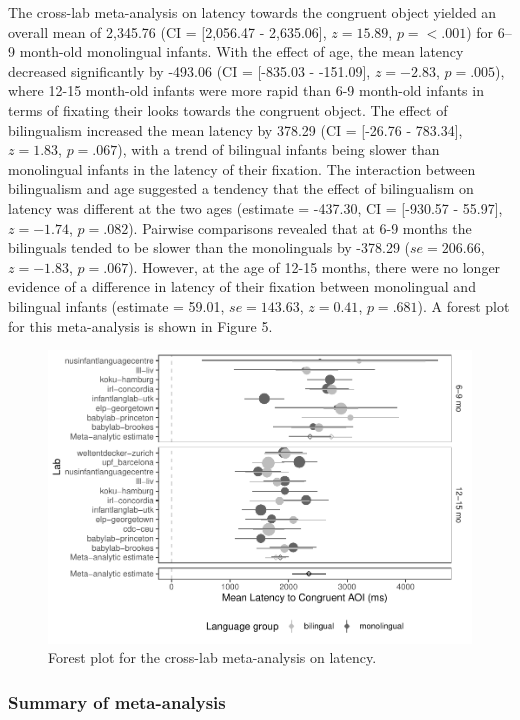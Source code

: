 \documentclass[,man,floatsintext]{apa6}
\begin{document}
The cross-lab meta-analysis on latency towards the congruent object yielded an overall mean of 2,345.76 (CI = {[}2,056.47 - 2,635.06{]}, \(z = 15.89\), \(p = < .001\)) for 6--9 month-old monolingual infants. With the effect of age, the mean latency decreased significantly by -493.06 (CI = {[}-835.03 - -151.09{]}, \(z = -2.83\), \(p = .005\)), where 12-15 month-old infants were more rapid than 6-9 month-old infants in terms of fixating their looks towards the congruent object. The effect of bilingualism increased the mean latency by 378.29 (CI = {[}-26.76 - 783.34{]}, \(z = 1.83\), \(p = .067\)), with a trend of bilingual infants being slower than monolingual infants in the latency of their fixation. The interaction between bilingualism and age suggested a tendency that the effect of bilingualism on latency was different at the two ages (estimate = -437.30, CI = {[}-930.57 - 55.97{]}, \(z = -1.74\), \(p = .082\)). Pairwise comparisons revealed that at 6-9 months the bilinguals tended to be slower than the monolinguals by -378.29 (\(se = 206.66\), \(z = -1.83\), \(p = .067\)). However, at the age of 12-15 months, there were no longer evidence of a difference in latency of their fixation between monolingual and bilingual infants (estimate = 59.01, \(se = 143.63\), \(z = 0.41\), \(p = .681\)). A forest plot for this meta-analysis is shown in Figure 5.

\begin{figure}
\centering
\includegraphics{gaze-following-paper_files/figure-latex/fig5-1.pdf}
\caption{\label{fig:fig5}Forest plot for the cross-lab meta-analysis on latency.}
\end{figure}

\hypertarget{summary-of-meta-analysis}{%
\subsubsection{Summary of meta-analysis}\label{summary-of-meta-analysis}}
\end{document}
